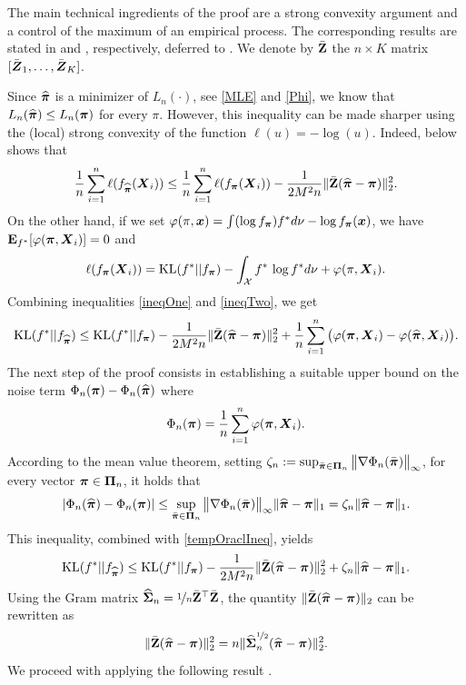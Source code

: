 The main technical ingredients of the proof are a strong convexity argument and a control of
the maximum of an empirical process. The corresponding results are stated in 
and , respectively, deferred to  . We denote by 
$\bar{\mathbf Z}$ the $n\times K$ matrix $[\bar{\boldsymbol Z}_1,\ldots,\bar{\boldsymbol Z}_K]$.

Since $\widehat{\boldsymbol \pi}$ is a minimizer of $L_n(\cdot)$, see \eqref{MLE} and \eqref{Phi}, we know that
$L_n(\widehat{\boldsymbol \pi})\le L_n(\boldsymbol \pi)$ for every $\pi$. However, this inequality can be made sharper using the
(local) strong convexity of the function $\ell(u) = -\log(u)$. Indeed,  below
shows that
\begin{equation}\label{ineqOne}
\frac{1}{n}\sum_{i=1}^n \ell(f_{\widehat{\boldsymbol \pi}}(\boldsymbol X_i)) \leq
\frac{1}{n}\sum_{i=1}^n \ell(f_{\boldsymbol \pi}(\boldsymbol X_i)) - \frac{1}{2M^2n}\|\bar{\mathbf Z}(\widehat{\boldsymbol \pi}-\boldsymbol \pi)\|^2_2.
\end{equation}
On the other hand, if we set $\varphi(\pi,\boldsymbol x) = \int (\log f_{\boldsymbol \pi})f^*d\nu -\log f_{\boldsymbol \pi}(\boldsymbol x)$, 
we have $\mathbf E_{f^*}[\varphi(\boldsymbol \pi,\boldsymbol X_i)]=0$ and
\begin{equation}\label{ineqTwo}
\ell(f_{\boldsymbol \pi}(\boldsymbol X_i)) = {\rm KL}(f^*||f_{\boldsymbol \pi}) -\int_{\mathcal X} f^*\,\log f^*d\nu+\varphi(\pi,\boldsymbol X_i).
\end{equation}
Combining inequalities \eqref{ineqOne} and \eqref{ineqTwo}, we get
\begin{equation}
\label{tempOraclIneq}
{\rm KL}(f^*|| f_{\widehat{\boldsymbol \pi}}) \leq {\rm KL}(f^*|| f_{\boldsymbol \pi})-\frac{1}{2M^2n}\|\bar{\mathbf Z}(\widehat{\boldsymbol \pi}-\boldsymbol \pi)\|_2^2
+ \frac1n\sum_{i=1}^n \big(\varphi(\boldsymbol \pi,\boldsymbol X_i)-\varphi(\widehat{\boldsymbol \pi},\boldsymbol X_i)\big).
\end{equation}
The next step of the proof consists in establishing a suitable upper bound on the noise term
$\Phi_n(\boldsymbol \pi)-\Phi_n(\widehat{\boldsymbol \pi})$
where
\begin{equation}
\Phi_n(\boldsymbol \pi) = \frac1n\sum_{i=1}^n \varphi(\boldsymbol \pi,\boldsymbol X_i).
\end{equation}
According to the mean value theorem, setting  $\zeta_n:= \sup_{\bar{\boldsymbol \pi}\in\boldsymbol\Pi_n}\big\| \nabla \Phi_n(\bar{\boldsymbol \pi})\big\|_\infty$,
for every vector $\boldsymbol \pi\in \boldsymbol\Pi_n$,
it holds that
\begin{equation}
|\Phi_n(\widehat{\boldsymbol \pi})-\Phi_n(\boldsymbol \pi)|\leq \sup_{\bar{\boldsymbol \pi}\in\boldsymbol\Pi_n}\big\| \nabla \Phi_n(\bar{\boldsymbol \pi})\big\|_\infty \|\widehat{\boldsymbol \pi}-\boldsymbol \pi \|_1 =
\zeta_n \|\widehat{\boldsymbol \pi}-\boldsymbol \pi \|_1.
\end{equation}
This inequality, combined  with \eqref{tempOraclIneq}, yields
\begin{equation}
\label{midIneqRes}
{\rm KL}(f^*|| f_{\widehat{\boldsymbol \pi}}) \leq {\rm KL}(f^*|| f_{\boldsymbol \pi})-\frac{1}{2M^2n}\|\bar{\mathbf Z}(\widehat{\boldsymbol \pi}-\boldsymbol \pi)\|_2^2
+ \zeta_n\|\widehat{\boldsymbol \pi} - \boldsymbol \pi \|_1.
\end{equation}
Using the Gram matrix $\widehat{\boldsymbol\Sigma}_n = \nicefrac1n\bar{\mathbf Z}^\top\bar{\mathbf Z}$, the quantity 
$\|\bar{\mathbf Z}(\widehat{\boldsymbol \pi} - \boldsymbol \pi)\|_2$ can be rewritten as
\begin{equation}
\label{gramRewrite}
\|\bar{\mathbf Z}(\widehat{\boldsymbol \pi} - \boldsymbol \pi)\|_2^2 = n\|\widehat{\boldsymbol\Sigma}_n^{\nicefrac12} (\widehat{\boldsymbol \pi} - \boldsymbol \pi)\|_2^2.
\end{equation}
We proceed with applying the following result \citep[Lemma~2]{BDGP}.

